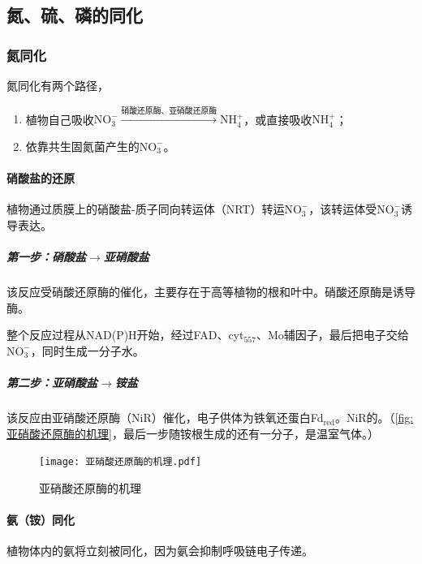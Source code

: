 \subsection{氮、硫、磷的同化}

\subsubsection{氮同化}

氮同化有两个路径，
\begin{enumerate}
	\item 植物自己吸收$\mathrm{NO_{3}^{-}}\xrightarrow{\text{硝酸还原酶、亚硝酸还原酶}}\mathrm{NH_{4}^{+}}$，或直接吸收$\mathrm{NH_{4}^{+}}$；
	\item 依靠共生固氮菌产生的$\mathrm{NO_{3}^{-}}$。
\end{enumerate}

\paragraph{硝酸盐的还原}

植物通过质膜上的硝酸盐-质子同向转运体（NRT）转运$\mathrm{NO_{3}^{-}}$，该转运体受$\mathrm{NO_{3}^{-}}$诱导表达。

\subparagraph{第一步：硝酸盐$\longrightarrow$亚硝酸盐}

该反应受硝酸还原酶的催化，主要存在于高等植物的根和叶中。硝酸还原酶是诱导酶。

整个反应过程从NAD(P)H开始，经过FAD、cyt$_{557}$、Mo辅因子，最后把电子交给$\mathrm{NO_{3}^{-}}$，同时生成一分子水。

\subparagraph{第二步：亚硝酸盐$\longrightarrow$铵盐}

该反应由亚硝酸还原酶（NiR）催化，电子供体为铁氧还蛋白Fd$_{\text{red}}$。NiR的。（\autoref{fig:亚硝酸还原酶的机理}，最后一步随铵根生成的还有一分子，是温室气体。）

\begin{figure}[htbp]
	\centering
	\texttt{[image: 亚硝酸还原酶的机理.pdf]}
	\caption{亚硝酸还原酶的机理}
	\label{fig:亚硝酸还原酶的机理}
\end{figure}

\paragraph{氨（铵）同化}

植物体内的氨将立刻被同化，因为氨会抑制呼吸链电子传递。

